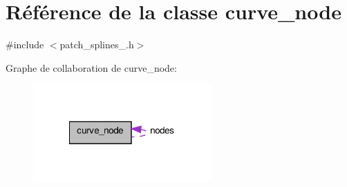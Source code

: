 \hypertarget{classcurve__node}{\section{Référence de la classe curve\+\_\+node}
\label{classcurve__node}
}


{\ttfamily \#include $<$patch\+\_\+splines\+\_.\+h$>$}



Graphe de collaboration de curve\+\_\+node\+:
\nopagebreak
\begin{figure}[H]
\begin{center}
\leavevmode
\includegraphics[width=194pt]{classcurve__node__coll__graph}
\end{center}
\end{figure}
